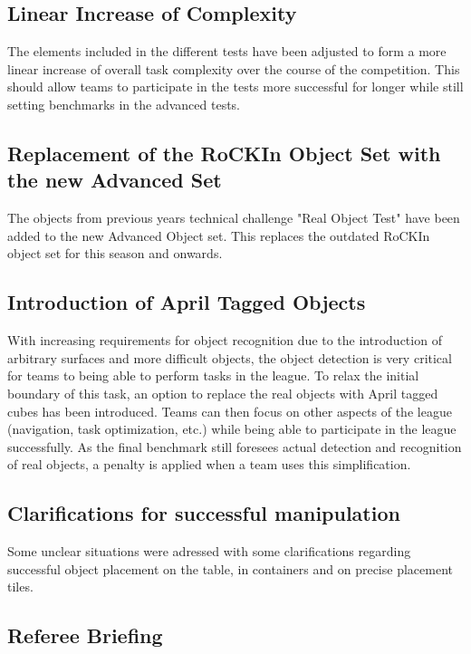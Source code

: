 \subsection{Linear Increase of Complexity}

The elements included in the different tests have been adjusted to form a more linear increase of overall task complexity over the course of the competition. This should allow teams to participate in the tests more successful for longer while still setting benchmarks in the advanced tests.

\subsection{Replacement of the RoCKIn Object Set with the new Advanced Set}

The objects from previous years technical challenge "Real Object Test" have been added to the new Advanced Object set. This replaces the outdated RoCKIn object set for this season and onwards.

\subsection{Introduction of April Tagged Objects}

With increasing requirements for object recognition due to the introduction of arbitrary surfaces and more difficult objects, the object detection is very critical for teams to being able to perform tasks in the league. To relax the initial boundary of this task, an option to replace the real objects with April tagged cubes has been introduced. Teams can then focus on other aspects of the league (navigation, task optimization, etc.) while being able to participate in the league successfully. As the final benchmark still foresees actual detection and recognition of real objects, a penalty is applied when a team uses this simplification.

\subsection{Clarifications for successful manipulation}

Some unclear situations were adressed with some clarifications regarding successful object placement on the table, in containers and on precise placement tiles.

\subsection{Referee Briefing}

